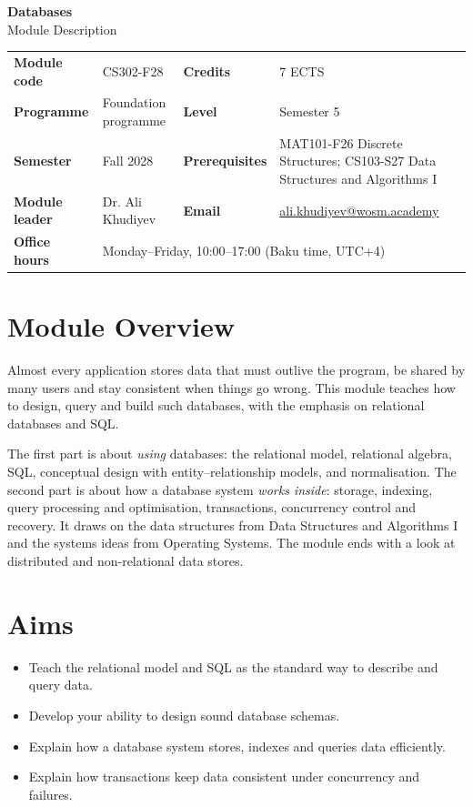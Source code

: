 \documentclass[11pt,a4paper]{article}
\makeatletter
\newcommand{\ModuleTitle}{Databases}
\newcommand{\ModuleCode}{CS302-F28}
\newcommand{\Programme}{Foundation programme}
\newcommand{\Level}{Semester 5}
\newcommand{\Semester}{Fall 2028}
\newcommand{\Credits}{7 ECTS}
\newcommand{\ModuleLeader}{Dr. Ali Khudiyev}
\newcommand{\Email}{ali.khudiyev@wosm.academy}
\newcommand{\OfficeHours}{Monday--Friday, 10:00--17:00 (Baku time, UTC+4)}
\newcommand{\Prerequisites}{MAT101-F26 Discrete Structures; CS103-S27 Data Structures and Algorithms I}
\makeatother
\begin{document}
\begin{center}
  {\LARGE\bfseries\color{accent} \ModuleTitle}\\[4pt]
  {\large Module Description}
\end{center}
\vspace{6pt}

\begin{tabularx}{\textwidth}{>{\bfseries}l X >{\bfseries}l X}
\toprule
Module code   & \ModuleCode    & Credits      & \Credits \\
Programme     & \Programme     & Level        & \Level \\
Semester      & \Semester      & Prerequisites & \Prerequisites \\
Module leader & \ModuleLeader  & Email        & \href{mailto:\Email}{\Email} \\
Office hours  & \multicolumn{3}{l}{\OfficeHours} \\
\bottomrule
\end{tabularx}

\section{Module Overview}
Almost every application stores data that must outlive the program, be shared by
many users and stay consistent when things go wrong. This module teaches how to
design, query and build such databases, with the emphasis on relational databases
and SQL.

The first part is about \emph{using} databases: the relational model, relational
algebra, SQL, conceptual design with entity--relationship models, and normalisation.
The second part is about how a database system \emph{works inside}: storage,
indexing, query processing and optimisation, transactions, concurrency control and
recovery. It draws on the data structures from Data Structures and Algorithms I and
the systems ideas from Operating Systems. The module ends with a look at distributed
and non-relational data stores.

\section{Aims}
\begin{itemize}
  \item Teach the relational model and SQL as the standard way to describe and query data.
  \item Develop your ability to design sound database schemas.
  \item Explain how a database system stores, indexes and queries data efficiently.
  \item Explain how transactions keep data consistent under concurrency and failures.
\end{itemize}
\end{document}
